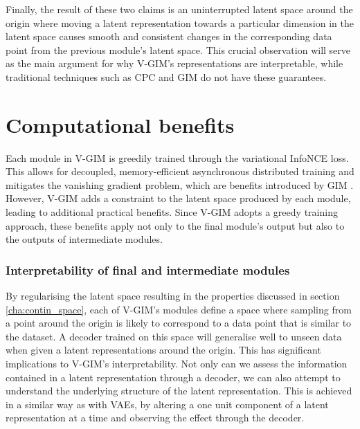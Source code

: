 			Finally, the result of these two claims is an uninterrupted latent space around the origin 
			where moving a latent representation towards a particular dimension in the latent space causes smooth and consistent changes in the corresponding data point from the previous module's latent space. This crucial observation will serve as the main argument for why V-GIM's representations are interpretable, while traditional techniques such as CPC and GIM do not have these guarantees. 
		

			

		
			


		
\section{Computational benefits} \label{cha:vgim_benefits}
	Each module in V-GIM is greedily trained through the variational InfoNCE loss. This allows for decoupled, memory-efficient asynchronous distributed training and mitigates the vanishing gradient problem, which are benefits introduced by GIM \cite{lowePuttingEndEndtoEnd2020}. However, V-GIM adds a constraint to the latent space produced by each module, leading to additional practical benefits. Since V-GIM adopts a greedy training approach, these benefits apply not only to the final module's output but also to the outputs of intermediate modules.
	

	\subsubsection{Interpretability of final and intermediate modules}
		By regularising the latent space resulting in the properties discussed in section \ref{cha:contin_space}, each of V-GIM's modules define a space where sampling from a point around the origin is likely to correspond to a data point that is similar to the dataset. A decoder trained on this space will generalise well to unseen data when given a latent representations around the origin. 
		This has significant implications to V-GIM's interpretability. Not only can we assess the information contained in a latent representation through a decoder, we can also attempt to understand the underlying structure of the latent representation. This is achieved in a similar way as with VAEs, by altering a one unit component of a latent representation at a time and observing the effect through the decoder.	
		
